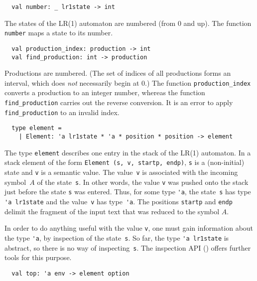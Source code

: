 \documentclass[onecolumn,11pt,nocopyrightspace,preprint]{sigplanconf}
\begin{document}
\begin{verbatim}
  val number: _ lr1state -> int
\end{verbatim}

The states of the LR(1) automaton are numbered (from 0 and up).
The function \verb+number+ maps a state to its number.


\begin{verbatim}
  val production_index: production -> int
  val find_production: int -> production
\end{verbatim}

Productions are numbered. (The set of indices of all productions forms an
interval, which does \emph{not} necessarily begin at 0.)
%
The function \verb+production_index+ converts a production to an integer
number, whereas the function \verb+find_production+ carries out the reverse
conversion. It is an error to apply \verb+find_production+ to an invalid
index.


\begin{verbatim}
  type element =
    | Element: 'a lr1state * 'a * position * position -> element
\end{verbatim}

The type \verb+element+ describes one entry in the stack of the LR(1)
automaton. In a stack element of the form \verb+Element (s, v, startp, endp)+,
\verb+s+ is a (non-initial) state and \verb+v+ is a semantic value. The
value~\verb+v+ is associated with the incoming symbol~$A$ of the
state~\verb+s+. In other words, the value \verb+v+ was pushed onto the stack
just before the state \verb+s+ was entered. Thus, for some type \verb+'a+, the
state~\verb+s+ has type \verb+'a lr1state+ and the value~\verb+v+ has
type~\verb+'a+. The positions \verb+startp+ and \verb+endp+ delimit the
fragment of the input text that was reduced to the symbol $A$.

In order to do anything useful with the value \verb+v+, one must gain
information about the type \verb+'a+, by inspection of the state~\verb+s+. So
far, the type \verb+'a lr1state+ is abstract, so there is no way of
inspecting~\verb+s+. The inspection API () offers further
tools for this purpose.


\begin{verbatim}
  val top: 'a env -> element option
\end{verbatim}
\end{document}
